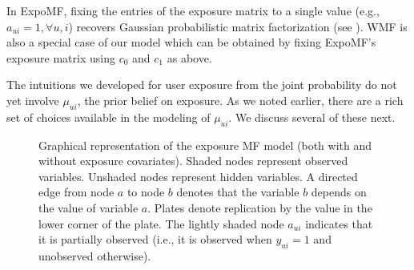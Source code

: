 In ExpoMF, fixing the entries of the exposure matrix to a single value
(e.g., $a_{ui}=1, \forall u, i$) recovers Gaussian probabilistic matrix
factorization \cite{mnih2007probabilistic} (see ). WMF is also a special case of
our model which can be obtained by fixing ExpoMF's exposure matrix using
$c_0$ and $c_1$ as above.

The intuitions we developed for 
user exposure from the joint probability 
do not yet involve $\mu_{ui}$, 
the prior belief on exposure. 
As we noted earlier, 
there are a rich set of choices 
available in the modeling of $\mu_{ui}$. 
We discuss several of these next.


\begin{figure}[!tbp]
  \centering
  \caption{Graphical representation of the exposure MF model (both with and without exposure covariates). 
  Shaded nodes represent observed variables.
Unshaded nodes represent hidden variables. A directed
edge from node $a$ to node $b$ denotes that the variable $b$ depends
on the value of variable $a$. Plates denote replication 
by the value in the lower corner of the plate. The lightly shaded node $a_{ui}$ indicates that it is partially observed (i.e., it is observed when $y_{ui} = 1$ and unobserved otherwise).}
\end{figure}

